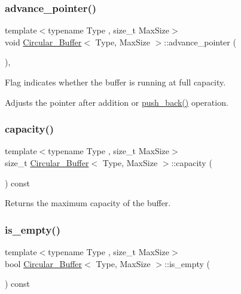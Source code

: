 \subsubsection{\texorpdfstring{advance\+\_\+pointer()}{advance\_pointer()}}
{\footnotesize\ttfamily template$<$typename Type , size\+\_\+t Max\+Size$>$ \\
void \hyperlink{classCircular__Buffer}{Circular\+\_\+\+Buffer}$<$ Type, Max\+Size $>$\+::advance\+\_\+pointer (\begin{DoxyParamCaption}{ }\end{DoxyParamCaption})\hspace{0.3cm}{\ttfamily [inline]}, {\ttfamily [private]}}



Flag indicates whether the buffer is running at full capacity. 

Adjusts the pointer after addition or \hyperlink{classCircular__Buffer_a2271c0b158052ae6491972ce7237f888}{push\+\_\+back()} operation. \mbox{\label{classCircular__Buffer_ad5ffdcccb9212547871ea6c1e399caca}} 
\subsubsection{\texorpdfstring{capacity()}{capacity()}}
{\footnotesize\ttfamily template$<$typename Type , size\+\_\+t Max\+Size$>$ \\
size\+\_\+t \hyperlink{classCircular__Buffer}{Circular\+\_\+\+Buffer}$<$ Type, Max\+Size $>$\+::capacity (\begin{DoxyParamCaption}{ }\end{DoxyParamCaption}) const\hspace{0.3cm}{\ttfamily [inline]}}



Returns the maximum capacity of the buffer. 

\mbox{\label{classCircular__Buffer_af2251f79c1509b7c1af0354ff7ac11fb}} 
\subsubsection{\texorpdfstring{is\+\_\+empty()}{is\_empty()}}
{\footnotesize\ttfamily template$<$typename Type , size\+\_\+t Max\+Size$>$ \\
bool \hyperlink{classCircular__Buffer}{Circular\+\_\+\+Buffer}$<$ Type, Max\+Size $>$\+::is\+\_\+empty (\begin{DoxyParamCaption}{ }\end{DoxyParamCaption}) const\hspace{0.3cm}{\ttfamily [inline]}}



